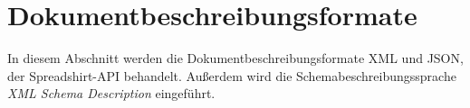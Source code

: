 \section{Dokumentbeschreibungsformate}
\label{sec:document_description_formats}

In diesem Abschnitt werden die Dokumentbeschreibungsformate \gls{XML} und \gls{JSON}, der Spreadshirt-\gls{API} behandelt. Außerdem wird die Schemabeschreibungssprache \emph{\textsc{XML} Schema Description} eingeführt.






